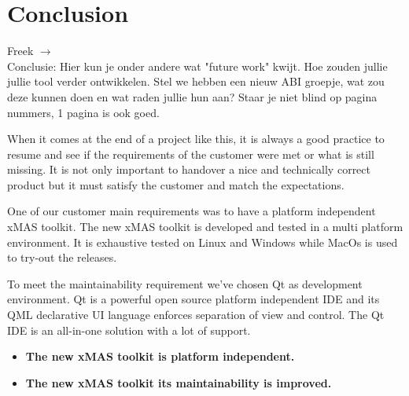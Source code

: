 \chapter*{Conclusion}

\begin{tcolorbox}[colback=yellow!30]
Freek $\rightarrow$ \\
 Conclusie: Hier kun je onder andere wat "future work" kwijt. Hoe zouden jullie jullie tool verder ontwikkelen. Stel we hebben een nieuw ABI groepje, wat zou deze kunnen doen en wat raden jullie hun aan? Staar je niet blind op pagina nummers, 1 pagina is ook goed.
\end{tcolorbox}


When it comes at the end of a project like this, it is always a good practice to
resume and see if the requirements of the customer were met or what is still
missing. It is not only important to handover a nice and technically correct
product but it must satisfy the customer and match the expectations.


One of our customer main requirements was to have a platform independent xMAS toolkit.
The new xMAS toolkit is developed and tested in a multi platform environment.
It is exhaustive tested on Linux and Windows while MacOs is used to try-out the releases.

To meet the maintainability requirement we've chosen Qt as development
environment. Qt is a powerful open source platform independent IDE and its QML
declarative UI language enforces separation of view and control. The Qt IDE is
an all-in-one solution with a lot of support.

\vspace{0.5 cm}

\begin{tcolorbox}[colback=white]
\begin{itemize}
\item \textbf{The new xMAS toolkit is platform independent.}
\item \textbf{The new xMAS toolkit its maintainability is improved.}
\end{itemize}
\end{tcolorbox}


